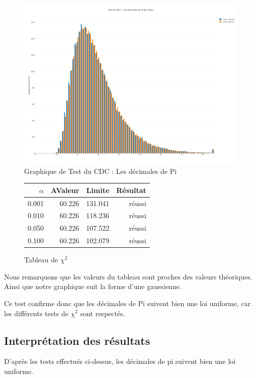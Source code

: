 \documentclass[10pt,a4paper]{article}
\begin{document}
\begin{figure}[h]
\centering
\includegraphics[scale=0.3]{../chart_images/cdc_deci.png}
\caption{Graphique de Test du CDC : Les décimales de Pi}
\end{figure}


\begin{figure}[h]
\centering
\begin{tabular}{|r|r|r|r|}
\hline
$\alpha$ & AValeur & Limite & Résultat\\
\hline
0.001 & 60.226 & 131.041 & réussi\\
0.010 & 60.226 & 118.236 & réussi\\
0.050 & 60.226 & 107.522 & réussi\\
0.100 & 60.226 & 102.079 & réussi\\
\hline
\end{tabular}
\caption{Tableau de $\chi^2$}
\end{figure}


Nous remarquons que les valeurs du tableau sont proches des valeurs théoriques. Ainsi que notre graphique suit la forme d'une gaussienne. 

Ce test confirme donc que les décimales de Pi suivent bien une loi uniforme, car les différents tests de $\chi^2$ sont respectés.

\newpage

\subsection{Interprétation des résultats}
D'après les tests effectués ci-dessus, les décimales de pi suivent bien une loi uniforme.
\end{document}
